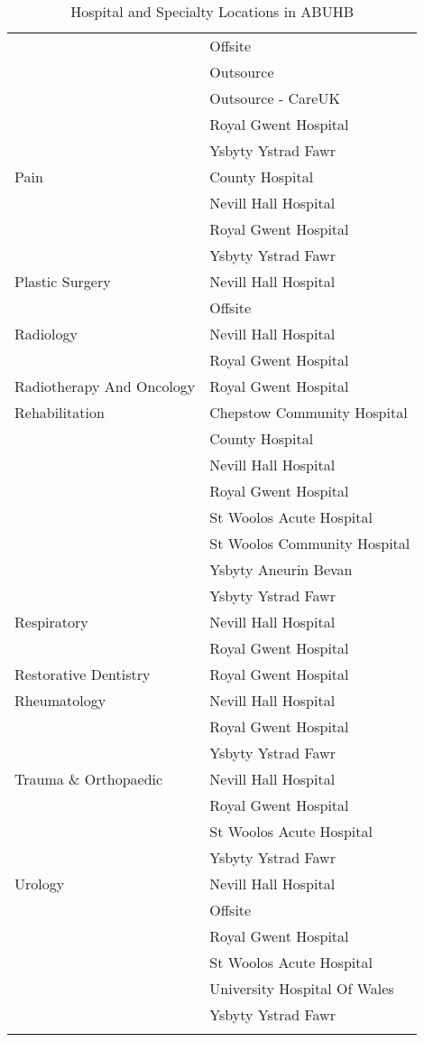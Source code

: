 \documentclass[thesis.tex]{subfiles}
\begin{document}
\begin{flushleft}
\begin{longtable}{ll}
	&Offsite\\
	&Outsource\\
	&Outsource - CareUK\\
	&Royal Gwent Hospital\\
	&Ysbyty Ystrad Fawr\\\hline
Pain	&County Hospital\\
	&Nevill Hall Hospital\\
	&Royal Gwent Hospital\\
	&Ysbyty Ystrad Fawr\\\hline
Plastic Surgery	&Nevill Hall Hospital\\
&	Offsite\\\hline
Radiology	&Nevill Hall Hospital\\
	&Royal Gwent Hospital\\\hline
Radiotherapy And Oncology&	Royal Gwent Hospital\\\hline
Rehabilitation&	Chepstow Community Hospital\\
	&County Hospital\\
	&Nevill Hall Hospital\\
	&Royal Gwent Hospital\\
	&St Woolos Acute Hospital\\
	&St Woolos Community Hospital\\
	&Ysbyty Aneurin Bevan\\
	&Ysbyty Ystrad Fawr\\\hline
Respiratory	&Nevill Hall Hospital\\
	&Royal Gwent Hospital\\\hline
Restorative Dentistry&	Royal Gwent Hospital\\\hline
Rheumatology&	Nevill Hall Hospital\\
	&Royal Gwent Hospital\\
	&Ysbyty Ystrad Fawr\\\hline
Trauma \& Orthopaedic&	Nevill Hall Hospital\\
	&Royal Gwent Hospital\\
	&St Woolos Acute Hospital\\
	&Ysbyty Ystrad Fawr\\\hline
Urology	&Nevill Hall Hospital\\
	&Offsite\\
	&Royal Gwent Hospital\\
	&St Woolos Acute Hospital\\
	&University Hospital Of Wales\\
	&Ysbyty Ystrad Fawr\\\hline
    \caption{Hospital and Specialty Locations in ABUHB}
    \label{tab:app_ABUHBHospLoc}
    \end{longtable}
        
    
\end{flushleft}
\end{document}
